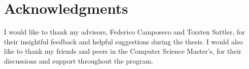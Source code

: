 \chapter{Acknowledgments}

I would like to thank my advisors, Federico Camposeco and Torsten Sattler, for their insightful feedback and helpful suggestions during the thesis. I would also like to thank my friends and peers in the Computer Science Master's, for their discussions and support throughout the program.